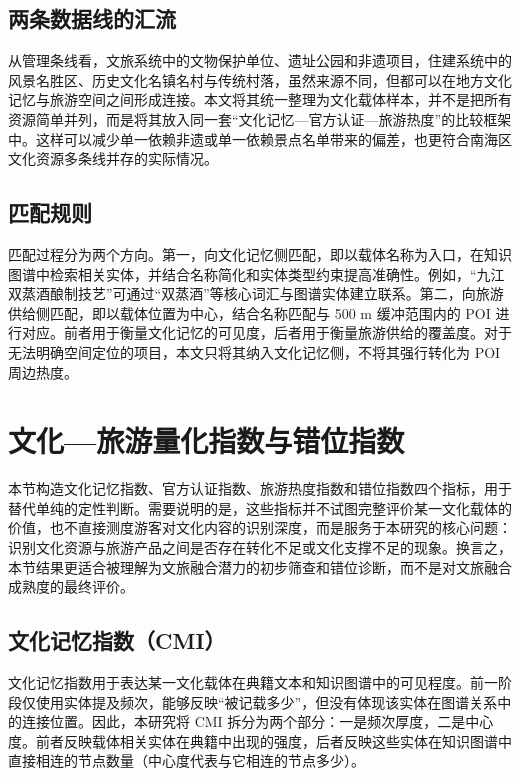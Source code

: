 \subsection{两条数据线的汇流}\label{ux4e24ux6761ux6570ux636eux7ebfux7684ux6c47ux6d41}

从管理条线看，文旅系统中的文物保护单位、遗址公园和非遗项目，住建系统中的风景名胜区、历史文化名镇名村与传统村落，虽然来源不同，但都可以在地方文化记忆与旅游空间之间形成连接。本文将其统一整理为文化载体样本，并不是把所有资源简单并列，而是将其放入同一套``文化记忆---官方认证---旅游热度''的比较框架中。这样可以减少单一依赖非遗或单一依赖景点名单带来的偏差，也更符合南海区文化资源多条线并存的实际情况。

\subsection{匹配规则}\label{ux5339ux914dux89c4ux5219}

匹配过程分为两个方向。第一，向文化记忆侧匹配，即以载体名称为入口，在知识图谱中检索相关实体，并结合名称简化和实体类型约束提高准确性。例如，``九江双蒸酒酿制技艺''可通过``双蒸酒''等核心词汇与图谱实体建立联系。第二，向旅游供给侧匹配，即以载体位置为中心，结合名称匹配与 500 m 缓冲范围内的 POI 进行对应。前者用于衡量文化记忆的可见度，后者用于衡量旅游供给的覆盖度。对于无法明确空间定位的项目，本文只将其纳入文化记忆侧，不将其强行转化为 POI 周边热度。

\section{文化---旅游量化指数与错位指数}\label{ux6587ux5316ux65c5ux6e38ux91cfux5316ux6307ux6570ux4e0eux9519ux4f4dux6307ux6570}

本节构造文化记忆指数、官方认证指数、旅游热度指数和错位指数四个指标，用于替代单纯的定性判断。需要说明的是，这些指标并不试图完整评价某一文化载体的价值，也不直接测度游客对文化内容的识别深度，而是服务于本研究的核心问题：识别文化资源与旅游产品之间是否存在转化不足或文化支撑不足的现象。换言之，本节结果更适合被理解为文旅融合潜力的初步筛查和错位诊断，而不是对文旅融合成熟度的最终评价。

\subsection{文化记忆指数（CMI）}\label{ux6587ux5316ux8bb0ux5fc6ux6307ux6570cmi}

文化记忆指数用于表达某一文化载体在典籍文本和知识图谱中的可见程度。前一阶段仅使用实体提及频次，能够反映``被记载多少''，但没有体现该实体在图谱关系中的连接位置。因此，本研究将 CMI 拆分为两个部分：一是频次厚度，二是中心度。前者反映载体相关实体在典籍中出现的强度，后者反映这些实体在知识图谱中直接相连的节点数量（中心度代表与它相连的节点多少）。

